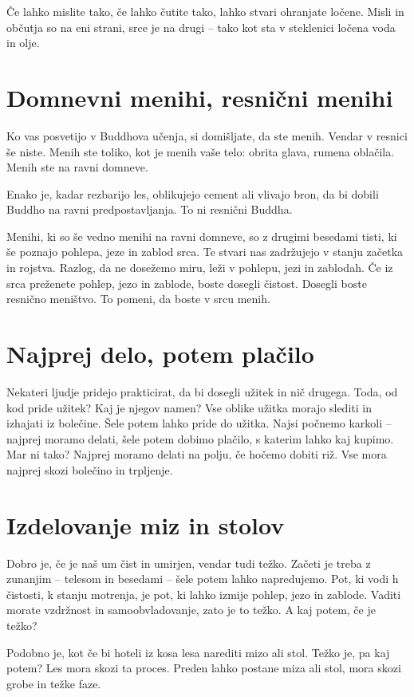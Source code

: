 Če lahko mislite tako, če lahko čutite tako, lahko stvari ohranjate ločene. Misli in občutja so na eni strani, srce je na drugi – tako kot sta v steklenici ločena voda in olje.

\section{Domnevni menihi, resnični menihi}

Ko vas posvetijo v Buddhova učenja, si domišljate, da ste menih. Vendar v resnici še niste. Menih ste toliko, kot je menih vaše telo: obrita glava, rumena oblačila. Menih ste na ravni domneve.

Enako je, kadar rezbarijo les, oblikujejo cement ali vlivajo bron, da bi dobili Buddho na ravni predpostavljanja. To ni resnični Buddha.

Menihi, ki so še vedno menihi na ravni domneve, so z drugimi besedami tisti, ki še poznajo pohlepa, jeze in zablod srca. Te stvari nas zadržujejo v stanju začetka in rojstva. Razlog, da ne dosežemo miru, leži v pohlepu, jezi in zablodah. Če iz srca preženete pohlep, jezo in zablode, boste dosegli čistost. Dosegli boste resnično meništvo. To pomeni, da boste v srcu menih.

\section{Najprej delo, potem plačilo}

Nekateri ljudje pridejo prakticirat, da bi dosegli užitek in nič drugega. Toda, od kod pride užitek? Kaj je njegov namen? Vse oblike užitka morajo slediti in izhajati iz bolečine. Šele potem lahko pride do užitka. Najsi počnemo karkoli – najprej moramo delati, šele potem dobimo plačilo, s katerim lahko kaj kupimo. Mar ni tako? Najprej moramo delati na polju, če hočemo dobiti riž. Vse mora najprej skozi bolečino in trpljenje.

\section{Izdelovanje miz in stolov}

Dobro je, če je naš um čist in umirjen, vendar tudi težko. Začeti je treba z zunanjim – telesom in besedami – šele potem lahko napredujemo. Pot, ki vodi h čistosti, k stanju motrenja, je pot, ki lahko izmije pohlep, jezo in zablode. Vaditi morate vzdržnost in samoobvladovanje, zato je to težko. A kaj potem, če je težko?

Podobno je, kot če bi hoteli iz kosa lesa narediti mizo ali stol. Težko je, pa kaj potem? Les mora skozi ta proces. Preden lahko postane miza ali stol, mora skozi grobe in težke faze.

